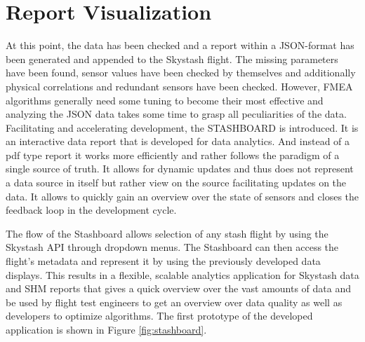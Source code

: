 \newpage


\section{Report Visualization}
\label{chap:4-visualization}

At this point, the data has been checked and a report within a JSON-format has been generated and appended to the Skystash flight. The missing parameters have been found, sensor values have been checked by themselves and additionally physical correlations and redundant sensors have been checked. However, FMEA algorithms generally need some tuning to become their most effective and analyzing the JSON data takes some time to grasp all peculiarities of the data. Facilitating and accelerating development, the STASHBOARD is introduced. It is an interactive data report that is developed for data analytics. And instead of a pdf type report it works more efficiently and rather follows the paradigm of a single source of truth. It allows for dynamic updates and thus does not represent a data source in itself but rather view on the source facilitating updates on the data. It allows to quickly gain an overview over the state of sensors and closes the feedback loop in the development cycle.

The flow of the Stashboard allows selection of any stash flight by using the Skystash API through dropdown menus. The Stashboard can then access the flight's metadata and represent it by using the previously developed data displays.
This results in a flexible, scalable analytics application for Skystash data and SHM reports that gives a quick overview over the vast amounts of data and be used by flight test engineers to get an overview over data quality as well as developers to optimize algorithms. The first prototype of the developed application is shown in Figure \ref{fig:stashboard}.

